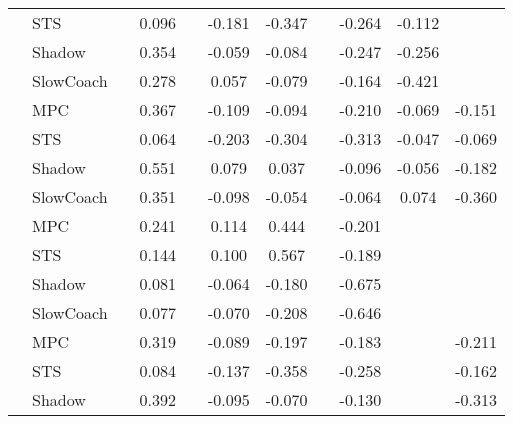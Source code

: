 \begin{tabular}{|l|l|*{9}{c|}}
                                                           & STS &       &     0.096 &        & -0.181 & -0.347 &     &  -0.264 &  -0.112 &       \\
                                                           & Shadow &       &     0.354 &        & -0.059 & -0.084 &     &  -0.247 &  -0.256 &       \\
                                                           & SlowCoach &       &     0.278 &        &  0.057 & -0.079 &     &  -0.164 &  -0.421 &       \\
\midrule
[False, True, False, True, True, False, True, True, True] & MPC &       &     0.367 &        & -0.109 & -0.094 &     &  -0.210 &  -0.069 &   -0.151 \\
                                                           & STS &       &     0.064 &        & -0.203 & -0.304 &     &  -0.313 &  -0.047 &   -0.069 \\
                                                           & Shadow &       &     0.551 &        &  0.079 &  0.037 &     &  -0.096 &  -0.056 &   -0.182 \\
                                                           & SlowCoach &       &     0.351 &        & -0.098 & -0.054 &     &  -0.064 &   0.074 &   -0.360 \\
\midrule
[False, True, False, True, True, False, True, False, False] & MPC &       &     0.241 &        &  0.114 &  0.444 &     &  -0.201 &      &       \\
                                                           & STS &       &     0.144 &        &  0.100 &  0.567 &     &  -0.189 &      &       \\
                                                           & Shadow &       &     0.081 &        & -0.064 & -0.180 &     &  -0.675 &      &       \\
                                                           & SlowCoach &       &     0.077 &        & -0.070 & -0.208 &     &  -0.646 &      &       \\
\midrule
[False, True, False, True, True, False, True, False, True] & MPC &       &     0.319 &        & -0.089 & -0.197 &     &  -0.183 &      &   -0.211 \\
                                                           & STS &       &     0.084 &        & -0.137 & -0.358 &     &  -0.258 &      &   -0.162 \\
                                                           & Shadow &       &     0.392 &        & -0.095 & -0.070 &     &  -0.130 &      &   -0.313 \\

\end{tabular}
